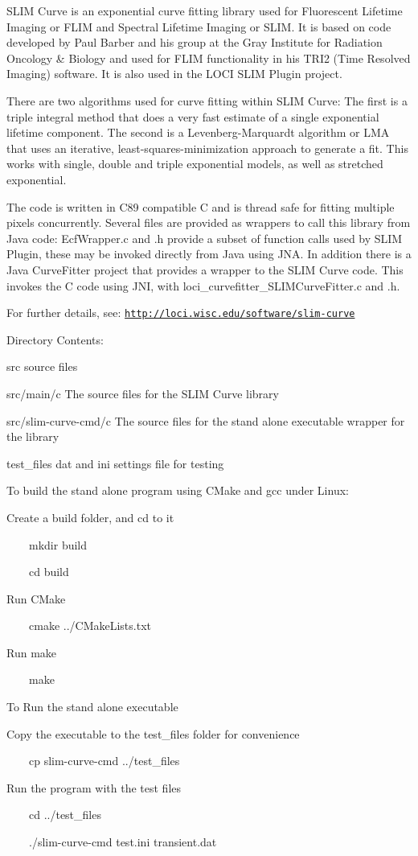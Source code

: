 S\-L\-I\-M Curve is an exponential curve fitting library used for Fluorescent Lifetime Imaging or F\-L\-I\-M and Spectral Lifetime Imaging or S\-L\-I\-M. It is based on code developed by Paul Barber and his group at the Gray Institute for Radiation Oncology \& Biology and used for F\-L\-I\-M functionality in his T\-R\-I2 (Time Resolved Imaging) software. It is also used in the L\-O\-C\-I S\-L\-I\-M Plugin project.

There are two algorithms used for curve fitting within S\-L\-I\-M Curve\-: The first is a triple integral method that does a very fast estimate of a single exponential lifetime component. The second is a Levenberg-\/\-Marquardt algorithm or L\-M\-A that uses an iterative, least-\/squares-\/minimization approach to generate a fit. This works with single, double and triple exponential models, as well as stretched exponential.

The code is written in C89 compatible C and is thread safe for fitting multiple pixels concurrently. Several files are provided as wrappers to call this library from Java code\-: Ecf\-Wrapper.\-c and .h provide a subset of function calls used by S\-L\-I\-M Plugin, these may be invoked directly from Java using J\-N\-A. In addition there is a Java Curve\-Fitter project that provides a wrapper to the S\-L\-I\-M Curve code. This invokes the C code using J\-N\-I, with loci\-\_\-curvefitter\-\_\-\-S\-L\-I\-M\-Curve\-Fitter.\-c and .h.

For further details, see\-: \href{http://loci.wisc.edu/software/slim-curve}{\tt http\-://loci.\-wisc.\-edu/software/slim-\/curve}

Directory Contents\-:\par
 src source files\par
 src/main/c The source files for the S\-L\-I\-M Curve library\par
 src/slim-\/curve-\/cmd/c The source files for the stand alone executable wrapper for the library\par
 test\-\_\-files dat and ini settings file for testing\par


To build the stand alone program using C\-Make and gcc under Linux\-:\par
 Create a build folder, and cd to it\par
 ~~~~mkdir build\par
 ~~~~cd build\par
 Run C\-Make\par
 ~~~~cmake ../\-C\-Make\-Lists.txt\par
 Run make\par
 ~~~~make\par


To Run the stand alone executable\par
 Copy the executable to the test\-\_\-files folder for convenience\par
 ~~~~cp slim-\/curve-\/cmd ../test\-\_\-files\par
 Run the program with the test files\par
 ~~~~cd ../test\-\_\-files\par
 ~~~~./slim-\/curve-\/cmd test.\-ini transient.\-dat\par
 